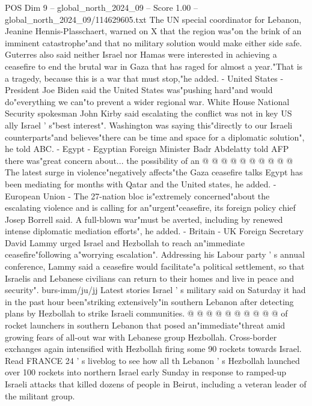\begin{textsample}{POS Dim 9 – global\_north\_2024\_09 – Score 1.00 – global\_north\_2024\_09/114629605.txt}  \label{ex:f9_pos_245}
The UN special coordinator for Lebanon, Jeanine Hennis-Plasschaert, warned on X that the region was"on the brink of an imminent catastrophe"and that no military solution would make either side safe.
Guterres also said neither Israel nor Hamas were interested in achieving a ceasefire to end the brutal war in Gaza that has raged for almost a year."That is a tragedy, because this is a war that must stop,"he added. - United States - President Joe Biden said the United States was"pushing hard"and would do"everything we can"to prevent a wider regional war.
White House National Security spokesman John Kirby said escalating the conflict was not in key US ally Israel ' s"best interest".
Washington was saying this"directly to our Israeli counterparts"and believes"there can be time and space for a diplomatic solution", he told ABC. - Egypt - Egyptian Foreign Minister Badr Abdelatty told AFP there was"great concern about... the possibility of an @ @ @ @ @ @ @ @ @ @ The latest surge in violence"negatively affects"the Gaza ceasefire talks Egypt has been mediating for months with Qatar and the United states, he added. - European Union - The 27-nation bloc is"extremely concerned"about the escalating violence and is calling for an"urgent"ceasefire, its foreign policy chief Josep Borrell said.
A full-blown war"must be averted, including by renewed intense diplomatic mediation efforts", he added. - Britain - UK Foreign Secretary David Lammy urged Israel and Hezbollah to reach an"immediate ceasefire"following a"worrying escalation".
Addressing his Labour party ' s annual conference, Lammy said a ceasefire would facilitate"a political settlement, so that Israelis and Lebanese civilians can return to their homes and live in peace and security". burs-imm/ju/jj Latest stories Israel ' s military said on Saturday it had in the past hour been"striking extensively"in southern Lebanon after detecting plans by Hezbollah to strike Israeli communities. @ @ @ @ @ @ @ @ @ @ of rocket launchers in southern Lebanon that posed an"immediate"threat amid growing fears of all-out war with Lebanese group Hezbollah.
Cross-border exchanges again intensified with Hezbollah firing some 90 rockets towards Israel.
Read FRANCE 24 ' s liveblog to see how all th Lebanon ' s Hezbollah launched over 100 rockets into northern Israel early Sunday in response to ramped-up Israeli attacks that killed dozens of people in Beirut, including a veteran leader of the militant group.

\end{textsample}
